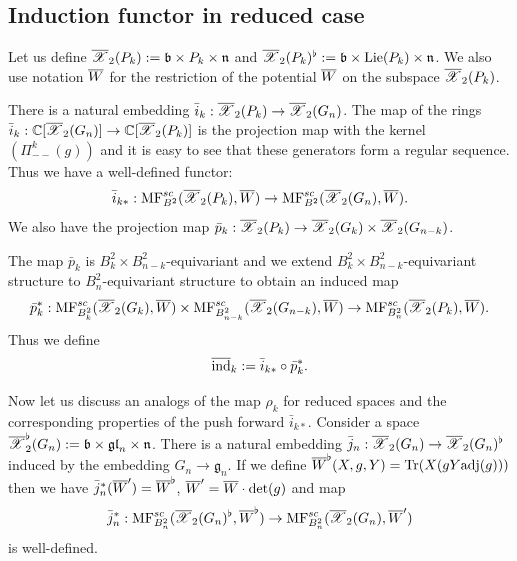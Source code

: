 \subsection{Induction functor in reduced case}

Let us
define $\overline{\mathscr{X}}_2(P_k):=\mathfrak{b}\times P_k\times \mathfrak{n}$ and $\overline{\mathscr{X}}_2(P_k)^\flat:=\mathfrak{b}\times\mathrm{Lie}(P_k)\times\mathfrak{n}$.
We also use notation $\overline{W}$ for the restriction of the potential $\overline{W}$ on the subspace $\overline{\mathscr{X}}_2(P_{k})$.

There is a natural embedding $\bar{i}_k: \overline{\mathscr{X}}_2(P_k)\to \overline{\mathscr{X}}_2(G_n)$.
The map of the rings $\bar{i}_{k}: \mathbb{C}[\overline{\mathscr{X}}_2(G_n)]\to \mathbb{C}[\overline{\mathscr{X}}_2(P_k)]$ is the projection map with the kernel $(\Pi^k_{--}(g))$ and it is easy to see that these generators
form a regular sequence. Thus we have a well-defined functor:
$$ \bar{i}_{k*}: \mathrm{MF}^{sc}_{B^2}(\overline{\mathscr{X}}_2(P_k),\overline{W})\to \mathrm{MF}^{sc}_{B^2}(\overline{\mathscr{X}}_2(G_n),\overline{W}).$$
We also have the projection map $\bar{p}_k: \overline{\mathscr{X}}_2(P_k)\to \overline{\mathscr{X}}_2(G_k)\times\overline{\mathscr{X}}_2(G_{n-k})$.


The map $\bar{p}_k$ is $B_{k}^2\times B_{n-k}^2$-equivariant and we extend $B_{k}^2\times B_{n-k}^2$-equivariant structure to
$B_n^2$-equivariant structure to obtain  an induced map $$\bar{p}^*_k:
\mathrm{MF}^{sc}_{B_k^2}(\overline{\mathscr{X}}_2(G_k),\overline{W})\times\mathrm{MF}^{sc}_{B_{n-k}^2}(\overline{\mathscr{X}}_2(G_{n-k}),\overline{W}) \to \mathrm{MF}^{sc}_{B_n^2}(\overline{\mathscr{X}}_2(P_k),\overline{W}).$$  Thus we define
$$\overline{\mathrm{ind}}_k:=\bar{i}_{k*}\circ \bar{p}_k^*.$$


Now let us discuss an analogs of the map $\rho_k$ for reduced spaces and the corresponding properties of the push forward $\bar{i}_{k*}$.
Consider a space $\overline{\mathscr{X}}_2^{\flat}(G_n):=\mathfrak{b}\times \mathfrak{gl}_n\times \mathfrak{n}$. There is
a natural embedding $\bar{j}_n: \overline{\mathscr{X}}_2(G_n)\to \overline{\mathscr{X}}_2(G_n)^\flat$ induced by the embedding $G_n\to \mathfrak{g}_n$. If we define $\overline{W}^\flat(X,g,Y)=\mathop{{\rm Tr}}\nolimits(X( gY\mathrm{adj}(g)))$ then we have
$\bar{j}^*_n(\overline{W}')=\overline{W}^\flat$, \(\overline{W}'=\overline{W}\cdot\det(g)\) and map
$$\bar{j}^*_n: \mathrm{MF}^{sc}_{B^2_n}(\overline{\mathscr{X}}_2(G_n)^\flat,\overline{W}^\flat)\to
\mathrm{MF}^{sc}_{B^2_n}(\overline{\mathscr{X}}_2(G_n),\overline{W}')$$ is well-defined.

